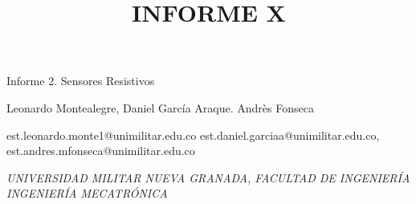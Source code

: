 \documentclass{article}
\title{INFORME X}
\begin{document}
\begin{center}
\Large{Informe 2. Sensores Resistivos}
\vspace{0.4cm}

\normalsize
Leonardo Montealegre, 
Daniel García Araque.
Andrès Fonseca


\vspace{0.1cm}

\normalsize
est.leonardo.monte1@unimilitar.edu.co
est.daniel.garciaa@unimilitar.edu.co,
est.andres.mfonseca@unimilitar.edu.co

\vspace{0.1cm}


\textit{\small{UNIVERSIDAD MILITAR NUEVA GRANADA, FACULTAD DE INGENIERÍA }\\
\small{INGENIERÍA MECATRÓNICA}}
\medskip


\normalsize
\end{center}
\end{document}

